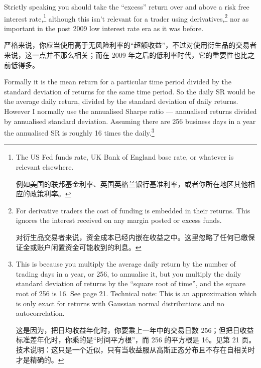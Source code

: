 \bipairgap

\begin{englishblock} Strictly speaking you should take the ``excess'' return over and above a risk free interest rate,\footnote{The US Fed funds rate, UK Bank of England base rate, or whatever is relevant elsewhere. \par 例如美国的联邦基金利率、英国英格兰银行基准利率，或者你所在地区其他相应的政策利率。} although this isn't relevant for a trader using derivatives,\footnote{For derivative traders the cost of funding is embedded in their returns. This ignores the interest received on any margin posted or excess funds. \par 对衍生品交易者来说，资金成本已经内嵌在收益之中。这里忽略了任何已缴保证金或账户闲置资金可能收到的利息。} nor as important in the post 2009 low interest rate era as it was before. \end{englishblock}

\begin{chineseblock}严格来说，你应当使用高于无风险利率的“超额收益”，不过对使用衍生品的交易者来说，这一点并不那么相关；而在 2009 年之后的低利率时代，它的重要性也比之前低得多。\end{chineseblock}

\bipairgap

\begin{englishblock} Formally it is the mean return for a particular time period divided by the standard deviation of returns for the same time period. So the daily SR would be the average daily return, divided by the standard deviation of daily returns. However I normally use the annualised Sharpe ratio --- annualised returns divided by annualised standard deviation. Assuming there are 256 business days in a year the annualised SR is roughly 16 times the daily.\footnote{This is because you multiply the average daily return by the number of trading days in a year, or 256, to annualise it, but you multiply the daily standard deviation of returns by the ``square root of time'', and the square root of 256 is 16. See page 21. Technical note: This is an approximation which is only exact for returns with Gaussian normal distributions and no autocorrelation. \par 这是因为，把日均收益年化时，你要乘上一年中的交易日数 256；但把日收益标准差年化时，你乘的是“时间平方根”，而 256 的平方根是 16。见第 21 页。技术说明：这只是一个近似，只有当收益服从高斯正态分布且不存在自相关时才是精确的。}\end{englishblock}

